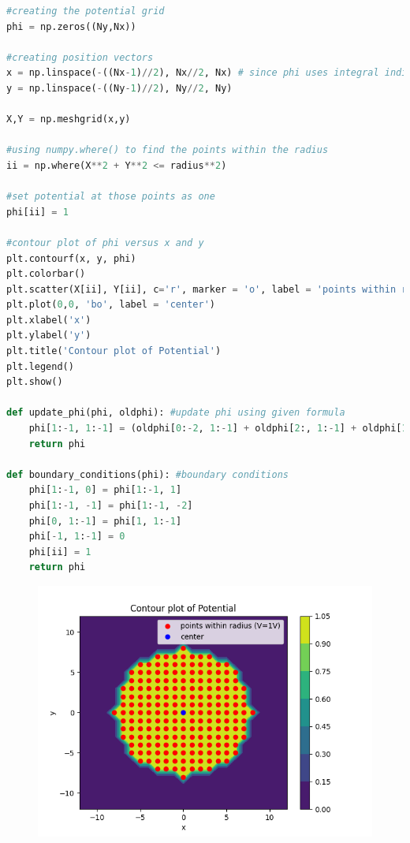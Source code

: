 \documentclass[11pt, a4paper]{article}
\begin{document}
\begin{lstlisting}[language = Python]
#creating the potential grid
phi = np.zeros((Ny,Nx))

#creating position vectors
x = np.linspace(-((Nx-1)//2), Nx//2, Nx) # since phi uses integral indices, we cannot just do -Nx/2,Nx/2
y = np.linspace(-((Ny-1)//2), Ny//2, Ny) 

X,Y = np.meshgrid(x,y)

#using numpy.where() to find the points within the radius
ii = np.where(X**2 + Y**2 <= radius**2)

#set potential at those points as one
phi[ii] = 1

#contour plot of phi versus x and y
plt.contourf(x, y, phi)
plt.colorbar()
plt.scatter(X[ii], Y[ii], c='r', marker = 'o', label = 'points within radius (V=1V)')
plt.plot(0,0, 'bo', label = 'center')
plt.xlabel('x')
plt.ylabel('y')
plt.title('Contour plot of Potential')
plt.legend()
plt.show()

def update_phi(phi, oldphi): #update phi using given formula
    phi[1:-1, 1:-1] = (oldphi[0:-2, 1:-1] + oldphi[2:, 1:-1] + oldphi[1:-1, 0:-2] + oldphi[1:-1, 2:])/4
    return phi

def boundary_conditions(phi): #boundary conditions
    phi[1:-1, 0] = phi[1:-1, 1]
    phi[1:-1, -1] = phi[1:-1, -2]
    phi[0, 1:-1] = phi[1, 1:-1]
    phi[-1, 1:-1] = 0
    phi[ii] = 1
    return phi
\end{lstlisting}

\begin{figure}[H]
     \centering
     \includegraphics[scale=0.8]{Figure_1.png}
\end{figure}
\end{document}
